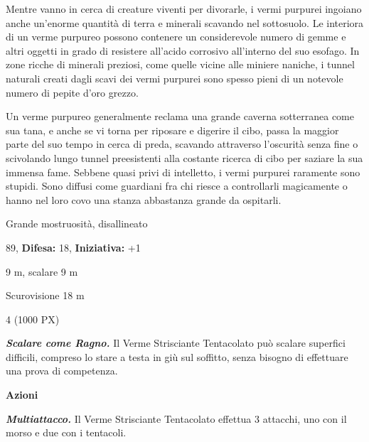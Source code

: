 \begin{multicols}{2}
{Mentre vanno in cerca di creature viventi per divorarle, i vermi purpurei ingoiano anche un'enorme quantità di terra e minerali scavando nel sottosuolo. Le interiora di un verme purpureo possono contenere un considerevole numero di gemme e altri oggetti in grado di resistere all'acido corrosivo all'interno del suo esofago. In zone ricche di minerali preziosi, come quelle vicine alle miniere naniche, i tunnel naturali creati dagli scavi dei vermi purpurei sono spesso pieni di un notevole numero di pepite d'oro grezzo.

Un verme purpureo generalmente reclama una grande caverna sotterranea come sua tana, e anche se vi torna per riposare e digerire il cibo, passa la maggior parte del suo tempo in cerca di preda, scavando attraverso l'oscurità senza fine o scivolando lungo tunnel preesistenti alla costante ricerca di cibo per saziare la sua immensa fame. Sebbene quasi privi di intelletto, i vermi purpurei raramente sono stupidi. Sono diffusi come guardiani fra chi riesce a controllarli magicamente o hanno nel loro covo una stanza abbastanza grande da ospitarli.

\noindent
\begin{description}[noitemsep, topsep=0pt, parsep=0pt, partopsep=0pt, leftmargin=0cm, labelwidth=2.2cm]
	\item[\textbf{Taglia/Tipo:}] Grande mostruosità, disallineato
	\item[\textbf{Caratt.:}] 
	\item[\textbf{Punti Ferita:}] 89,  \textbf{Difesa:} 18,  \textbf{Iniziativa:} +1
	\item[\textbf{Movimento:}] 9 m, scalare 9 m
	\item[\textbf{Tiri Salvez.:}] 
	\item[\textbf{Sensi:}] Scurovisione 18 m
	\item[\textbf{Sfida:}] 4 (1000 PX)\smallskip
\end{description}

\emph{\textbf{Scalare come Ragno.}} Il Verme Strisciante Tentacolato può scalare superfici difficili, compreso lo stare a testa in giù sul soffitto, senza bisogno di effettuare una prova di competenza.

\textbf{Azioni}

\emph{\textbf{Multiattacco.}} Il Verme Strisciante Tentacolato effettua 3 attacchi, uno con il morso e due con i tentacoli.

}
\end{multicols}
